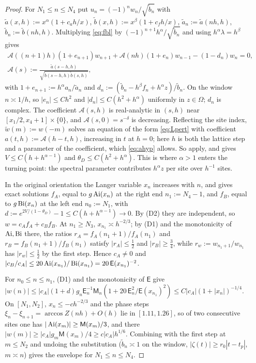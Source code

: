 \begin{proof}
 For $N_1\le n\le N_4$ put $u_n=(-1)^nw_n/\sqrt{\tilde b_n}$ with
$\tilde a(x,h):=x^\alpha(1+c_ah/x)$, $\tilde b(x,h):=x^\beta(1+c_fh/x)$, $\tilde a_n:=\tilde a(nh,h)$,
$\tilde b_n:=\tilde b(nh,h)$. Multiplying \eqref{eq:fbl} by $(-1)^{n+1}h^\alpha/\sqrt{\tilde b_n}$ and using
$h^\alpha\lambda=h^\beta$ gives
\[
  \begin{gathered}
  \mathcal A((n+1)h)(1+e_{n+1})w_{n+1}+\mathcal A(nh)(1+e_n)w_{n-1}-(1-d_n)w_n=0,\\
  \mathcal A(s):=\frac{\tilde a(s-h,h)}{\sqrt{\tilde b(s-h,h)\tilde b(s,h)}},
  \end{gathered}
\]
with $1+e_{n+1}:=h^\alpha a_n/\tilde a_n$ and $d_n:=(\tilde b_n-h^\beta f_n+h^\alpha z)/\tilde b_n$. On the window
$n\asymp1/h$, so $|e_n|\le Ch^2$ and $|d_n|\le C(h^2+h^\alpha)$ uniformly in $z\in\Omega$; $d_n$ is
complex. The coefficient $\mathcal A(s,h)$ is real-analytic in $(s,h)$ near $[x_1/2,x_4+1]\times\{0\}$, and
$\mathcal A(s,0)=s^{-\delta}$ is decreasing. Reflecting the site index, $\tilde w(m):=w(-m)$ solves an
equation of the form \eqref{eq:Lpert} with coefficient $a(t,h):=\mathcal A(h-t,h)$, increasing in $t$
at $h=0$; here $h$ is both the lattice step and a parameter of the coefficient, which
\eqref{eq:ahyp} allows. So  apply, and  gives
$V\le C(h+h^{\alpha-1})$ and $\theta_D\le C(h^2+h^\alpha)$. This is where $\alpha>1$ enters the turning
point: the spectral parameter contributes $h^\alpha z$ per site over $h^{-1}$ sites.

 In the original orientation the Langer variable
$x_n$ increases with $n$, and  gives exact solutions $f_A$, equal to $g\operatorname{Ai}(x_n)$ at
the right end $n_1:=N_4-1$, and $f_B$, equal to $g\operatorname{Bi}(x_n)$ at the left end $n_0:=N_1$, with
$d:=e^{2V/(1-\theta_D)}-1\le C(h+h^{\alpha-1})\to0$. By (D2) they are independent, so $w=c_Af_A+c_Bf_B$.
At $n_1\ge N_3$, $x_{n_1}\asymp h^{-2/3}$; by (D1) and the monotonicity of $\operatorname{Ai},\operatorname{Bi}$ there, the
ratios $r_A=f_A(n_1+1)/f_A(n_1)$ and $r_B=f_B(n_1+1)/f_B(n_1)$ satisfy $|r_A|\le\frac12$ and
$|r_B|\ge\frac34$, while $r_w:=w_{n_1+1}/w_{n_1}$ has $|r_w|\le\frac12$ by the first step. Hence
$c_A\ne0$ and $|c_B/c_A|\le20\operatorname{Ai}(x_{n_1})/\operatorname{Bi}(x_{n_1})=20\,\mathsf E(x_{n_1})^{-2}$.

 For $n_0\le n\le n_1$, (D1) and the monotonicity of $\mathsf E$ give
$|w(n)|\le|c_A|(1+d)g_n\mathsf E_n^{-1}\mathsf M_n(1+20\,\mathsf E_n^2/\mathsf E(x_{n_1})^2)\le C|c_A|(1+|x_n|)^{-1/4}$.
On $[N_1,N_2]$, $x_n\le-ch^{-2/3}$ and the phase steps $\xi_n-\xi_{n+1}=\arccos Z(nh)+O(h)$ lie in
$[1.11,1.26]$, so of two consecutive sites one has $|\operatorname{Ai}(x_m)|\ge\mathsf M(x_m)/3$, and there
$|w(m)|\ge|c_A|g_m\mathsf M(x_m)/4\ge c|c_A|h^{1/6}$. Combining with the first step at $m\le N_2$
and undoing the substitution ($\tilde b_n\asymp1$ on the window, $|\zeta(t)|\ge r_0|t-t_p|$, $m\asymp n$)
gives the envelope for $N_1\le n\le N_4$.


\end{proof}
